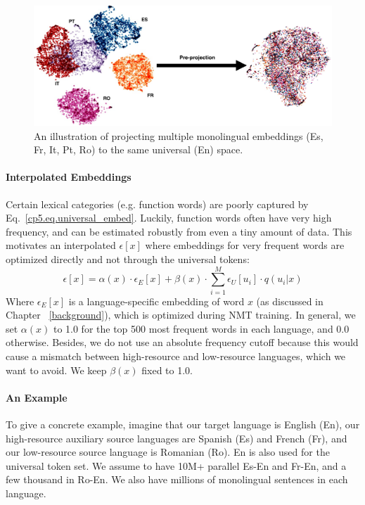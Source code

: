 \begin{figure}[hptb]
	\centering
	\includegraphics[width=\linewidth]{figs/ulr/preprojection}
      \caption{\label{cp5.fig.preproj} An illustration of projecting multiple monolingual embeddings (Es, Fr, It, Pt, Ro) to the same universal (En) space.}
  \end{figure}


\paragraph{Interpolated Embeddings}
Certain lexical categories (e.g. function words) are poorly captured by Eq.~\eqref{cp5.eq.universal_embed}. Luckily, function words often have very high frequency, and can be estimated robustly from even a tiny amount of data. This motivates an interpolated $\epsilon[x]$ where embeddings for very frequent words are optimized directly and  not through the universal tokens:
\begin{equation}
	\epsilon[x] = \alpha(x) \cdot \epsilon_E[x] + \beta(x) \cdot \sum_{i=1}^M \epsilon_U[u_i] \cdot q(u_i|x)
\end{equation}
Where $\epsilon_E[x]$ is a language-specific embedding of word $x$ (as discussed in Chapter ~\ref{background}), which is optimized during NMT training. In general, we set $\alpha(x)$ to 1.0 for the top 500 most frequent words in each language, and 0.0 otherwise. Besides, we do not use an absolute frequency cutoff because this would cause a mismatch between high-resource and low-resource languages, which we want to avoid. We keep $\beta(x)$ fixed to 1.0.

\paragraph{An Example} To give a concrete example, imagine that our target language is English (En), our high-resource auxiliary source languages are Spanish (Es) and French (Fr), and our low-resource source language is Romanian (Ro). En is also used for the universal token set. We assume to have 10M+ parallel Es-En and Fr-En, and a few thousand in Ro-En. We also have millions of monolingual sentences in each language.

